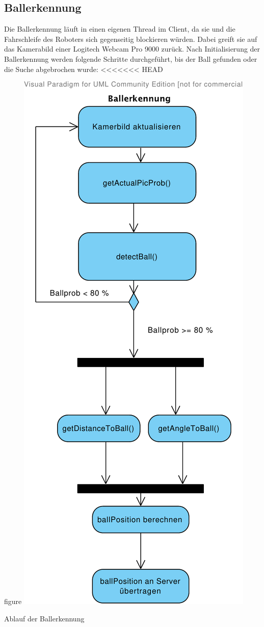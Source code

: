 \subsection{Ballerkennung}

\label{sec:balldetection}
Die Ballerkennung läuft in einen eigenen Thread im Client, da sie und
die Fahrschleife des Roboters sich gegenseitig blockieren
würden. Dabei greift sie auf das Kamerabild einer Logitech Webcam Pro 9000
zurück. Nach Initialisierung der Ballerkennung
werden folgende Schritte durchgeführt, bis der Ball gefunden oder die
Suche abgebrochen wurde:
<<<<<<< HEAD
\begin{nofloat}{figure}
\centering
\includegraphics[width=0.5\linewidth]{bilder/balldetect_uml}
  \caption{Ablauf der Ballerkennung}
\end{nofloat}

